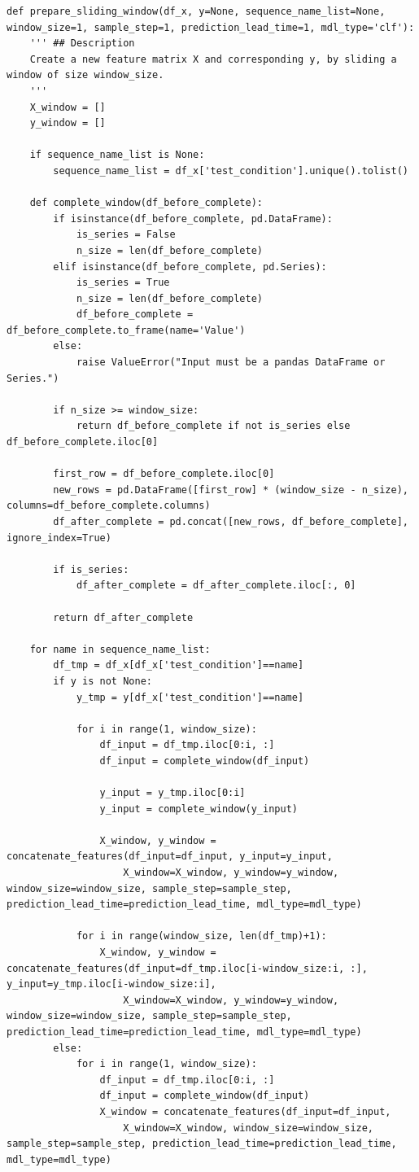 \documentclass[11pt,a4paper]{article}
\begin{document}
\begin{lstlisting}[style=pyfull]
def prepare_sliding_window(df_x, y=None, sequence_name_list=None, window_size=1, sample_step=1, prediction_lead_time=1, mdl_type='clf'):
    ''' ## Description
    Create a new feature matrix X and corresponding y, by sliding a window of size window_size.
    '''
    X_window = []
    y_window = []

    if sequence_name_list is None:
        sequence_name_list = df_x['test_condition'].unique().tolist()

    def complete_window(df_before_complete):
        if isinstance(df_before_complete, pd.DataFrame):
            is_series = False
            n_size = len(df_before_complete)
        elif isinstance(df_before_complete, pd.Series):
            is_series = True
            n_size = len(df_before_complete)
            df_before_complete = df_before_complete.to_frame(name='Value')
        else:
            raise ValueError("Input must be a pandas DataFrame or Series.")

        if n_size >= window_size:
            return df_before_complete if not is_series else df_before_complete.iloc[0]

        first_row = df_before_complete.iloc[0]
        new_rows = pd.DataFrame([first_row] * (window_size - n_size), columns=df_before_complete.columns)
        df_after_complete = pd.concat([new_rows, df_before_complete], ignore_index=True)

        if is_series:
            df_after_complete = df_after_complete.iloc[:, 0]

        return df_after_complete

    for name in sequence_name_list:
        df_tmp = df_x[df_x['test_condition']==name]
        if y is not None:
            y_tmp = y[df_x['test_condition']==name]

            for i in range(1, window_size):
                df_input = df_tmp.iloc[0:i, :]
                df_input = complete_window(df_input)

                y_input = y_tmp.iloc[0:i]
                y_input = complete_window(y_input)

                X_window, y_window = concatenate_features(df_input=df_input, y_input=y_input,
                    X_window=X_window, y_window=y_window, window_size=window_size, sample_step=sample_step, prediction_lead_time=prediction_lead_time, mdl_type=mdl_type)

            for i in range(window_size, len(df_tmp)+1):
                X_window, y_window = concatenate_features(df_input=df_tmp.iloc[i-window_size:i, :], y_input=y_tmp.iloc[i-window_size:i],
                    X_window=X_window, y_window=y_window, window_size=window_size, sample_step=sample_step, prediction_lead_time=prediction_lead_time, mdl_type=mdl_type)
        else:
            for i in range(1, window_size):
                df_input = df_tmp.iloc[0:i, :]
                df_input = complete_window(df_input)
                X_window = concatenate_features(df_input=df_input,
                    X_window=X_window, window_size=window_size, sample_step=sample_step, prediction_lead_time=prediction_lead_time, mdl_type=mdl_type)


\end{lstlisting}
\end{document}
